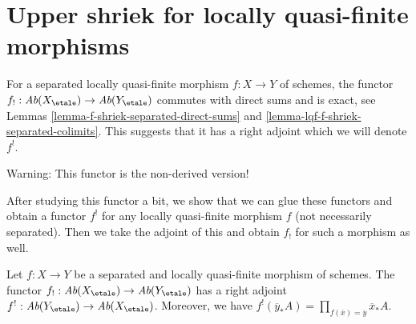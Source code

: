 \section{Upper shriek for locally quasi-finite morphisms}
\label{section-duality-locally-quasi-finite}

\noindent
For a separated locally quasi-finite morphism $f : X \to Y$ of schemes, the
functor $f_! : \textit{Ab}(X_\etale) \to \textit{Ab}(Y_\etale)$ commutes
with direct sums and is exact, see
Lemmas \ref{lemma-f-shriek-separated-direct-sums} and
\ref{lemma-lqf-f-shriek-separated-colimits}.
This suggests that it has a right adjoint which we will
denote $f^!$.

\medskip\noindent
Warning: This functor is the non-derived version!

\medskip\noindent
After studying this functor a bit, we show that we can glue
these functors and obtain a functor $f^!$ for any locally
quasi-finite morphism $f$ (not necessarily separated). Then we take
the adjoint of this and obtain $f_!$ for such a morphism as well.

\begin{lemma}
\label{lemma-lqf-f-upper-shriek-separated}
Let $f : X \to Y$ be a separated and locally quasi-finite morphism
of schemes. The functor
$f_! : \textit{Ab}(X_\etale) \to \textit{Ab}(Y_\etale)$
has a right adjoint
$f^! : \textit{Ab}(Y_\etale) \to \textit{Ab}(X_\etale)$.
Moreover, we have $f^!(\overline{y}_*A) =
\prod_{f(\overline{x}) = \overline{y}} \overline{x}_*A$.
\end{lemma}

